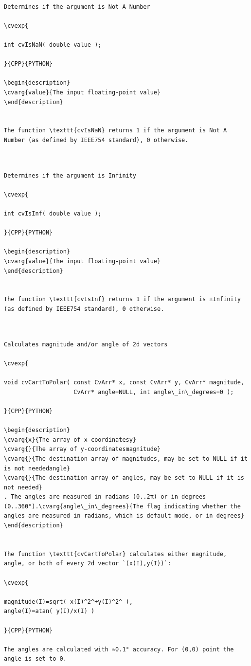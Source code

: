 \label{IsNaN}
\begin{verbatim}

Determines if the argument is Not A Number

\cvexp{

int cvIsNaN( double value );

}{CPP}{PYTHON}

\begin{description}
\cvarg{value}{The input floating-point value}
\end{description}


The function \texttt{cvIsNaN} returns 1 if the argument is Not A Number (as defined by IEEE754 standard), 0 otherwise.


\end{verbatim}
\label{IsInf}
\begin{verbatim}

Determines if the argument is Infinity

\cvexp{

int cvIsInf( double value );

}{CPP}{PYTHON}

\begin{description}
\cvarg{value}{The input floating-point value}
\end{description}


The function \texttt{cvIsInf} returns 1 if the argument is ±Infinity (as defined by IEEE754 standard), 0 otherwise.


\end{verbatim}
\label{CartToPolar}
\begin{verbatim}

Calculates magnitude and/or angle of 2d vectors

\cvexp{

void cvCartToPolar( const CvArr* x, const CvArr* y, CvArr* magnitude,
                    CvArr* angle=NULL, int angle\_in\_degrees=0 );

}{CPP}{PYTHON}

\begin{description}
\cvarg{x}{The array of x-coordinatesy}
\cvarg{}{The array of y-coordinatesmagnitude}
\cvarg{}{The destination array of magnitudes, may be set to NULL if it is not neededangle}
\cvarg{}{The destination array of angles, may be set to NULL if it is not needed}
. The angles are measured in radians (0..2π) or in degrees (0..360°).\cvarg{angle\_in\_degrees}{The flag indicating whether the angles are measured in radians, which is default mode, or in degrees}
\end{description}


The function \texttt{cvCartToPolar} calculates either magnitude, angle, or both of every 2d vector `(x(I),y(I))`:

\cvexp{

magnitude(I)=sqrt( x(I)^2^+y(I)^2^ ),
angle(I)=atan( y(I)/x(I) )

}{CPP}{PYTHON}

The angles are calculated with ≈0.1° accuracy. For (0,0) point the angle is set to 0.


\end{verbatim}
